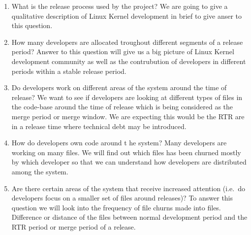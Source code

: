\documentclass{acm_proc_article-sp}
\begin{document}
\renewcommand{\labelenumi}{Q\theenumi:}
\begin{enumerate}
\item What is the release process used by the project? \newline
We are going to give a qualitative description of Linux Kernel development in brief to give anser to this question.
\item How many developers are allocated troughout different segments of a release period? \newline
Answer to this question will give us a big picture of Linux Kernel development community as well as the contrubution of developers in different periods within a stable release period.
\item Do developers work on different areas of the system around the time of release? \newline
We want to see if developers are looking at different types of files in the code-base around the time of release which is being considered as the merge period or merge window\cite{linux_kernel}. We are expecting this would be the RTR are in a release time where technical debt may be introduced.
\item How do developers own code around t he system?
Many developers are working on many files. We will find out which files has been churned mostly by which developer so that we can understand how developers are distributed among the system.
\item Are there certain areas of the system that receive increased attention (i.e.\ do developers focus on a smaller set of files around releases)? \newline
To answer this question we will look into the frequency of file churns made into files. Difference or distance of the files between normal development period and the RTR period or merge period of a release.
\end{enumerate}
\end{document}
